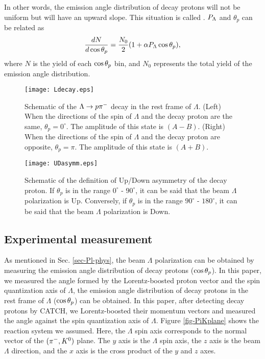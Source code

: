 In other words, the emission angle distribution of decay protons will not be uniform but will have an upward slope. This situation is called . $P_{\Lambda}$ and $\theta_{p}$ can be related as 
\begin{equation}
  \frac{dN}{d\cos{\theta_p}} = \frac{N_0}{2}(1+\alpha P_{\Lambda}\cos{\theta_p}), 
  \label{eq-costp}
\end{equation}
where $N$ is the yield of each $\cos{\theta_p}$ bin, and $N_0$ represents the total yield of the emission angle distribution. %

\begin{figure}[h]
  \centering
  \texttt{[image: Ldecay.eps]}
  \caption{Schematic of the $\Lambda\to p\pi^{-}$ decay in the rest frame of $\Lambda$. (Left) When the directions of the spin of $\Lambda$ and the decay proton are the same, $\theta_{p}=0^{\circ}$. The amplitude of this state is $(A-B)$. (Right) When the directions of the spin of $\Lambda$ and the decay proton are opposite, $\theta_{p}=\pi$. The amplitude of this state is $(A+B)$.}
  \label{fig-Ldecay}
\end{figure}

\begin{figure}[h]
  \centering
  \texttt{[image: UDasymm.eps]}
  \caption{Schematic of the definition of Up/Down asymmetry of the decay proton. If $\theta_{p}$ is in the range $0^{\circ}$ - $90^{\circ}$, it can be said that the beam $\Lambda$ polarization is Up. Conversely, if $\theta_{p}$ is in the range $90^{\circ}$ - $180^{\circ}$, it can be said that the beam $\Lambda$ polarization is Down.}
  \label{fig-UDasymm}
\end{figure}


\subsection{Experimental measurement}

As mentioned in Sec. \ref{sec-Pl-phys}, the beam $\Lambda$ polarization can be obtained by measuring the emission angle distribution of decay protons ($\cos{\theta_p}$). In this paper, we measured the angle formed by the Lorentz-boosted proton vector and the spin quantization axis of $\Lambda$, the emission angle distribution of decay protons in the rest frame of $\Lambda$ ($\cos{\theta_p}$) can be obtained. In this paper, after detecting decay protons by CATCH, we Lorentz-boosted their momentum vectors and measured the angle against the spin quantization axis of $\Lambda$. Figure \ref{fig-PiKplane} shows the reaction system we assumed. Here, the $\Lambda$ spin axis corresponds to the normal vector of the $(\pi^-,K^0)$ plane. The $y$ axis is the $\Lambda$ spin axis, the $z$ axis is the beam $\Lambda$ direction, and the $x$ axis is the cross product of the $y$ and $z$ axes. 

